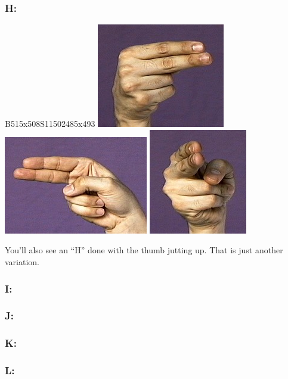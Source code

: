 \documentclass{article}
\begin{document}
\subsubsection{H:}

B515x508S11502485x493 \includegraphics[scale=0.5]{images/h1.jpg} \includegraphics[scale=0.5]{images/h2.jpg} \includegraphics[scale=0.5]{images/h3.jpg}

You'll also see an ``H'' done with the thumb jutting up.
That is just another variation.
\subsubsection{I:}
\subsubsection{J:}

\subsubsection{K:}
\subsubsection{L:}
\end{document}
